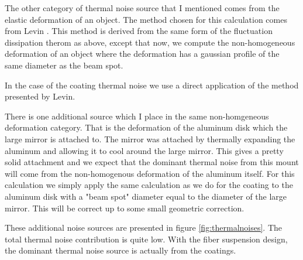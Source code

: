 The other category of thermal noise source that I mentioned comes from the
elastic deformation of an object.
The method chosen for this calculation comes from Levin \cite{PhysRevD.57.659}.
This method is derived from the same form of the fluctuation dissipation therom
as above, except that now, we compute the non-homogeneous deformation of
an object where the deformation has a gaussian profile of the same diameter
as the beam spot.

In the case of the coating thermal noise we use a direct application of the
method presented by Levin.

There is one additional source which I place in the same non-homgeneous
deformation category.
That is the deformation of the aluminum disk which the large mirror is
attached to.
The mirror was attached by thermally expanding the aluminum and allowing it to
cool around the large mirror.
This gives a pretty solid attachment and we expect that the dominant thermal
noise from this mount will come from the non-homogenous deformation of the
aluminum itself.
For this calculation we simply apply the same calculation as we do for the
coating to the aluminum disk with a "beam spot" diameter equal to the
diameter of the large mirror.
This will be correct up to some small geometric correction.



These additional noise sources are presented in figure \ref{fig:thermalnoises}.
The total thermal noise contribution is quite low.
With the fiber suspension design, the dominant thermal noise source is actually
from the coatings.


